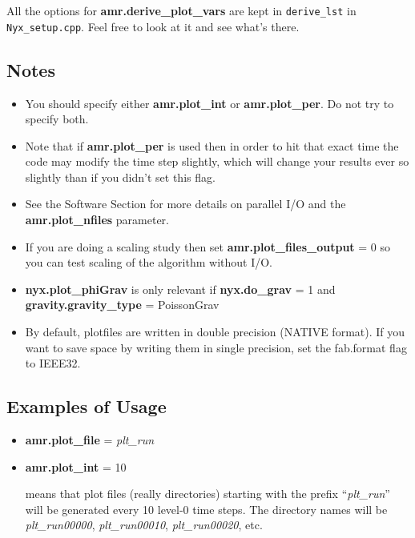 All the options for {\bf amr.derive\_plot\_vars} are kept in
\texttt{derive\_lst} in {\tt Nyx\_setup.cpp}.  Feel free to look at it and see what's there. 


\subsection{Notes}

\begin{itemize}

\item You should specify either {\bf amr.plot\_int} or {\bf amr.plot\_per}.  Do not try to specify both. 

\item Note that if {\bf amr.plot\_per} is used then in order to hit that exact time the 
code may modify the time step slightly, which will change your results ever so slightly 
than if you didn't set this flag.

\item See the Software Section for more details on parallel I/O and the 
{\bf amr.plot\_nfiles} parameter.

\item If you are doing a scaling study then set {\bf amr.plot\_files\_output} = 0
so you can test scaling of the algorithm without I/O.

\item {\bf nyx.plot\_phiGrav} is only relevant if 
{\bf nyx.do\_grav} = 1 and {\bf gravity.gravity\_type} = PoissonGrav

\item By default, plotfiles are written in double precision (NATIVE format).  If you want to 
save space by writing them in single precision, set the fab.format flag to IEEE32.

\end{itemize}

\subsection{Examples of Usage}

\begin{itemize}

\item {\bf amr.plot\_file} = {\em plt\_run}
\item {\bf amr.plot\_int} = 10

means that plot files (really directories) starting with the prefix
``{\em plt\_run}'' will be
generated every 10 level-0 time steps.  The directory names will be {\em plt\_run00000}, 
{\em plt\_run00010}, {\em plt\_run00020}, etc.

\end{itemize}

